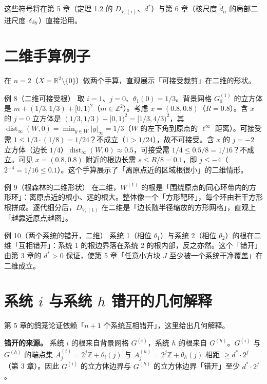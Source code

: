 \documentclass[a4paper,11pt,openany]{ctexbook}
\numberwithin{equation}{chapter}
\numberwithin{figure}{chapter}
\numberwithin{table}{chapter}
\begin{document}
这些符号将在第 5 章（定理 1.2 的 $D_{V,(i)}$、$d^*$）与第 6 章（核尺度 $\widetilde d_\alpha$ 的局部二进尺度 $\delta_{\rm dy}$）直接沿用。

\section{二维手算例子}

在 $n=2$（$X=\mathbb R^2\setminus\{0\}$）做两个手算，直观展示「可接受裁剪」在二维的形状。

\begin{examplebox}{例 8（二维可接受根）}
取 $i=1$、$j=0$、$\theta_1(0)=1/3$。背景网格 $G_0^{(1)}$ 的立方体是 $m+(1/3,1/3)+[0,1)^2$（$m\in\mathbb Z^2$）。考虑 $x=(0.8,0.8)$（$R=0.8$）。含 $x$ 的 $j=0$ 立方体是 $(1/3,1/3)+[0,1)^2=[1/3,4/3)^2$，其 $\operatorname{dist}_\infty(W,0)=\min_{y\in W}|y|_\infty=1/3$（$W$ 的左下角到原点的 $\ell^\infty$ 距离）。可接受需 $1\le1/3\cdot(1/8)=1/24$？不成立（$1>1/24$），故不可接受。含 $x$ 的 $j=-2$ 立方体（边长 $1/4$）$\operatorname{dist}_\infty(W,0)\approx0.5$，可接受需 $1/4\le0.5/8=1/16$？不成立。可见 $x=(0.8,0.8)$ 附近的根边长需 $s\le R/8=0.1$，即 $j\le-4$（$2^{-4}=1/16\le0.1$）。这个手算展示了「离原点近的区域根很小」的二维情形。
\end{examplebox}

\begin{examplebox}{例 9（根森林的二维形状）}
在二维，$W^{(1)}$ 的根是「围绕原点的同心环带内的方形环」：离原点近的根小、远的根大。整体像一个「方形靶环」，每个环由若干方形根拼成。逐代细分后，$D_{V,(1)}$ 在二维是「边长随半径缩放的方形网格」，直观上「越靠近原点越密」。
\end{examplebox}

\begin{examplebox}{例 10（两个系统的错开，二维）}
系统 1（相位 $\theta_1$）与系统 2（相位 $\theta_2$）的根在二维「互相错开」：系统 1 的根边界落在系统 2 的根内部，反之亦然。这个「错开」由第 3 章的 $d^*>0$ 保证，使第 5 章「任意小方块 $J$ 至少被一个系统干净覆盖」在二维成立。
\end{examplebox}

\section{系统 $i$ 与系统 $h$ 错开的几何解释}

第 5 章的鸽笼论证依赖「$n+1$ 个系统互相错开」，这里给出几何解释。

\textbf{错开的来源。} 系统 $i$ 的根来自背景网格 $G^{(i)}$，系统 $h$ 的根来自 $G^{(h)}$。$G^{(i)}$ 与 $G^{(h)}$ 的端点集 $A_j^{(i)}=2^j\mathbb Z+\theta_i(j)$ 与 $A_j^{(h)}=2^j\mathbb Z+\theta_h(j)$ 相距 $\ge d^*\cdot2^j$（第 3 章）。因此 $G^{(i)}$ 的立方体边界与 $G^{(h)}$ 的立方体边界「错开」至少 $d^*\cdot2^j$。
\end{document}

